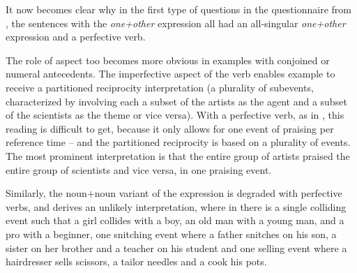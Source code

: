 \documentclass[output=paper,colorlinks,citecolor=brown]{langscibook}
\begin{document}
\noindent It now becomes clear why in the first type of questions in the questionnaire from , the sentences with the \textit{one+other} expression all had an all-singular \textit{one+other} expression and a perfective verb.

The role of aspect too becomes more obvious in examples with conjoined or numeral antecedents. The imperfective aspect of the verb enables example  to receive a partitioned reciprocity interpretation (a plurality of subevents, characterized by involving each a subset of the artists as the agent and a subset of the scientists as the theme or vice versa). With a perfective verb, as in , this reading is difficult to get, because it only allows for one event of praising per reference time -- and the partitioned reciprocity is based on a plurality of events. The most prominent interpretation is that the entire group of artists praised the entire group of scientists and vice versa, in one praising event.

\ea\label{Umetnici3} 
\label{Umetnici3-a}

\label{Umetnici3-b}
 \z \z

\noindent Similarly, the noun$+$noun variant of the expression is degraded with perfective verbs, and derives an unlikely interpretation, where in  there is a single colliding event such that a girl collides with a boy, an old man with a young man, and a pro with a beginner, one snitching event where a father snitches on his son, a sister on her brother and a teacher on his student and one selling event where a hairdresser sells scissors, a tailor needles and a cook his pots.

\ea\label{Klizači3} 
\label{Klizači3-a}
\end{document}

